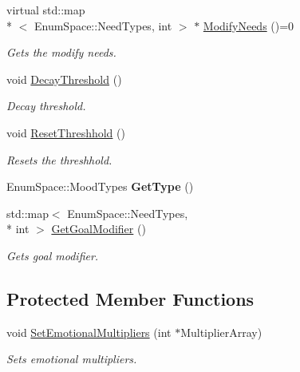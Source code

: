 \begin{DoxyCompactItemize}
\item 
virtual std\-::map\\*
$<$ Enum\-Space\-::\-Need\-Types, int $>$ $\ast$ \hyperlink{classabstract_a4d2dc1025b0473a6ca5ae7947cb71fa0}{Modify\-Needs} ()=0
\begin{DoxyCompactList}\small\item\em Gets the modify needs. \end{DoxyCompactList}\item 
void \hyperlink{classabstract_ac5e4f73645472118e0389af89ef557d6}{Decay\-Threshold} ()
\begin{DoxyCompactList}\small\item\em Decay threshold. \end{DoxyCompactList}\item 
void \hyperlink{classabstract_a778b0df167d92a449a3b9a4f73508f50}{Reset\-Threshhold} ()
\begin{DoxyCompactList}\small\item\em Resets the threshhold. \end{DoxyCompactList}\item 
\hypertarget{classabstract_a6a684ea689b2d2272e085b562d25e1df}{Enum\-Space\-::\-Mood\-Types {\bfseries Get\-Type} ()}\label{classabstract_a6a684ea689b2d2272e085b562d25e1df}

\item 
std\-::map$<$ Enum\-Space\-::\-Need\-Types, \\*
int $>$ \hyperlink{classabstract_a9b6fe4d59bd164a1edbab5403cf0c56a}{Get\-Goal\-Modifier} ()
\begin{DoxyCompactList}\small\item\em Gets goal modifier. \end{DoxyCompactList}\end{DoxyCompactItemize}
\subsection*{Protected Member Functions}
\begin{DoxyCompactItemize}
\item 
void \hyperlink{classabstract_a0d4a292e4371e387c37ed3152f40f970}{Set\-Emotional\-Multipliers} (int $\ast$Multiplier\-Array)
\begin{DoxyCompactList}\small\item\em Sets emotional multipliers. \end{DoxyCompactList}\end{DoxyCompactItemize}
